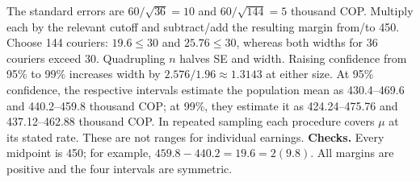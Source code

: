 The standard errors are $60/\sqrt{36}=10$ and $60/\sqrt{144}=5$ thousand COP. Multiply each by the relevant cutoff and subtract/add the resulting margin from/to 450.
Choose 144 couriers: $19.6\le30$ and $25.76\le30$, whereas both widths for 36 couriers exceed 30. Quadrupling $n$ halves SE and width. Raising confidence from 95\% to 99\% increases width by $2.576/1.96\approx1.3143$ at either size.
At 95\% confidence, the respective intervals estimate the population mean as 430.4--469.6 and 440.2--459.8 thousand COP; at 99\%, they estimate it as 424.24--475.76 and 437.12--462.88 thousand COP. In repeated sampling each procedure covers $\mu$ at its stated rate. These are not ranges for individual earnings.
\textbf{Checks.} Every midpoint is 450; for example, $459.8-440.2=19.6=2(9.8)$. All margins are positive and the four intervals are symmetric.

